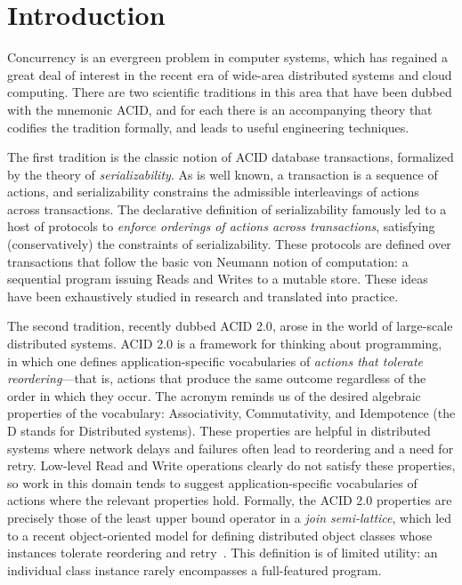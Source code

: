 \documentclass{sig-alternate}
\begin{document}
\section{Introduction}
Concurrency is an evergreen problem in computer systems, which has regained a
great deal of interest in the recent era of wide-area distributed systems and
cloud computing.  There are two scientific traditions in this area that have
been dubbed with the mnemonic \textsf{ACID}, and for each there is an
accompanying theory that codifies the tradition formally, and leads to useful
engineering techniques.

The first tradition is the classic notion of \textsf{ACID} database
transactions, formalized by the theory of \emph{serializability}.  As is well
known, a transaction is a sequence of actions, and serializability constrains
the admissible interleavings of actions across transactions.  The declarative
definition of serializability famously led to a host of protocols to
\emph{enforce orderings of actions across transactions}, satisfying
(conservatively) the constraints of serializability.  These protocols are
defined over transactions that follow the basic von Neumann notion of
computation: a sequential program issuing Reads and Writes to a mutable store.
These ideas have been exhaustively studied in research and translated into
practice.

The second tradition, recently dubbed \textsf{ACID 2.0}, arose in the world of
large-scale distributed systems.  ACID 2.0 is a framework for thinking about
programming, in which one defines application-specific vocabularies of
\emph{actions that tolerate reordering}---that is, actions that produce the same
outcome regardless of the order in which they occur.  The acronym reminds us of
the desired algebraic properties of the vocabulary: Associativity,
Commutativity, and Idempotence (the D stands for Distributed systems).  These
properties are helpful in distributed systems where network delays and failures
often lead to reordering and a need for retry. Low-level Read and Write
operations clearly do not satisfy these properties, so work in this domain tends
to suggest application-specific vocabularies of actions where the relevant
properties hold.  Formally, the ACID 2.0 properties are precisely those of the
least upper bound operator in a {\em join semi-lattice}, which led to a recent
object-oriented model for defining distributed object classes whose instances
tolerate reordering and retry~\cite{CRDTs}.  This definition is of limited
utility: an individual class instance rarely encompasses a full-featured
program.
\end{document}
